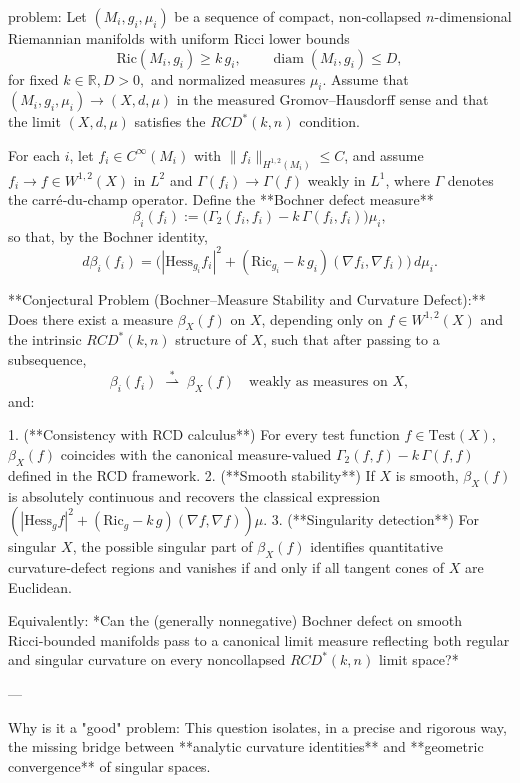 problem:  
Let \((M_i,g_i,\mu_i)\) be a sequence of compact, non‑collapsed \(n\)-dimensional Riemannian manifolds with uniform Ricci lower bounds  
\[
\mathrm{Ric}(M_i,g_i)\ge k\,g_i, \qquad \operatorname{diam}(M_i,g_i)\le D,
\]
for fixed \(k \in \mathbb{R}, D>0,\) and normalized measures \(\mu_i\).  
Assume that \((M_i,g_i,\mu_i)\to(X,d,\mu)\) in the measured Gromov–Hausdorff sense and that the limit \((X,d,\mu)\) satisfies the \(RCD^*(k,n)\) condition.  

For each \(i\), let \(f_i\in C^\infty(M_i)\) with \(\|f_i\|_{H^{1,2}(M_i)}\le C\), and assume \(f_i\to f\in W^{1,2}(X)\) in \(L^2\) and \(\Gamma(f_i)\to \Gamma(f)\) weakly in \(L^1\), where \(\Gamma\) denotes the carré‑du‑champ operator.  
Define the **Bochner defect measure**
\[
\beta_i(f_i) := \bigl(\Gamma_2(f_i,f_i)-k\,\Gamma(f_i,f_i)\bigr)\mu_i,
\]
so that, by the Bochner identity,
\[
d\beta_i(f_i)= \bigl(|\mathrm{Hess}_{g_i}f_i|^2 + (\mathrm{Ric}_{g_i} - k\,g_i)(\nabla f_i, \nabla f_i)\bigr)\,d\mu_i.
\]

**Conjectural Problem (Bochner–Measure Stability and Curvature Defect):**  
Does there exist a measure \(\beta_X(f)\) on \(X\), depending only on \(f\in W^{1,2}(X)\) and the intrinsic \(RCD^*(k,n)\) structure of \(X\), such that after passing to a subsequence,
\[
\beta_i(f_i)\;\stackrel{*}{\rightharpoonup}\; \beta_X(f)
\quad\text{weakly as measures on } X,
\]
and:

1. (**Consistency with RCD calculus**) For every test function \(f\in \mathrm{Test}(X)\), \(\beta_X(f)\) coincides with the canonical measure-valued \(\Gamma_2(f,f)-k\,\Gamma(f,f)\) defined in the RCD framework.  
2. (**Smooth stability**) If \(X\) is smooth, \(\beta_X(f)\) is absolutely continuous and recovers the classical expression \( ( |\mathrm{Hess}_g f|^2 + (\mathrm{Ric}_g - k\,g)(\nabla f,\nabla f))\mu\).  
3. (**Singularity detection**) For singular \(X\), the possible singular part of \(\beta_X(f)\) identifies quantitative curvature‑defect regions and vanishes if and only if all tangent cones of \(X\) are Euclidean.

Equivalently: *Can the (generally nonnegative) Bochner defect on smooth Ricci‑bounded manifolds pass to a canonical limit measure reflecting both regular and singular curvature on every noncollapsed \(RCD^*(k,n)\) limit space?*

---

Why is it a "good" problem:  
This question isolates, in a precise and rigorous way, the missing bridge between **analytic curvature identities** and **geometric convergence** of singular spaces.

